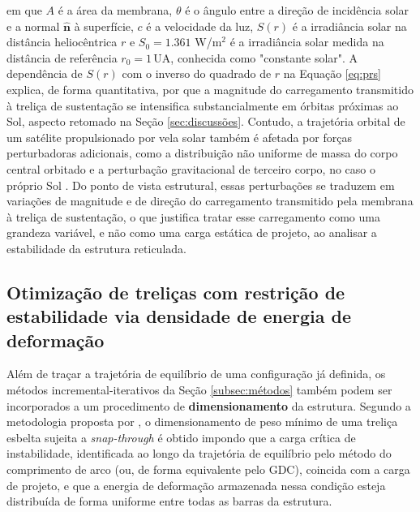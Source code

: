 em que $A$ é a área da membrana, $\theta$ é o ângulo entre a
direção de incidência solar e a normal $\hat{\mathbf{n}}$ à
superfície, $c$ é a velocidade da luz, $S(r)$ é a irradiância solar
na distância heliocêntrica $r$ e $S_0 = 1.361$ W/m$^2$ é a irradiância solar medida na distância de referência $r_0 = 1\,$UA, conhecida como "constante solar". A dependência de
$S(r)$ com o inverso do quadrado de $r$ na Equação \ref{eq:prs}
explica, de forma quantitativa, por que a magnitude do
carregamento transmitido à treliça de sustentação se intensifica
substancialmente em órbitas próximas ao Sol, aspecto retomado na
Seção \ref{sec:discussões}. Contudo, a trajetória orbital de um satélite
propulsionado por vela solar também é afetada por forças
perturbadoras adicionais, como a distribuição não uniforme de massa
do corpo central orbitado e a perturbação gravitacional de terceiro
corpo, no caso o próprio Sol \cite{silva2020}. Do ponto de vista
estrutural, essas perturbações se traduzem em variações de
magnitude e de direção do carregamento transmitido pela membrana à
treliça de sustentação, o que justifica tratar esse carregamento
como uma grandeza variável, e não como uma carga estática de
projeto, ao analisar a estabilidade da estrutura reticulada.


 
\subsection{Otimização de treliças com restrição de estabilidade
via densidade de energia de deformação}
\label{subsec:sed}
 
Além de traçar a trajetória de equilíbrio de uma configuração já
definida, os métodos incremental-iterativos da Seção
\ref{subsec:métodos} também podem ser incorporados a um
procedimento de \textbf{dimensionamento} da estrutura. Segundo a
metodologia proposta por \citealp{hrinda_nguyen2008}, o
dimensionamento de peso mínimo de uma treliça esbelta sujeita a
\textit{snap-through} é obtido impondo que a carga crítica de
instabilidade, identificada ao longo da trajetória de equilíbrio
pelo método do comprimento de arco (ou, de forma equivalente pelo
GDC), coincida com a carga de projeto, e que a energia de
deformação armazenada nessa condição esteja distribuída de forma
uniforme entre todas as barras da estrutura.
 
